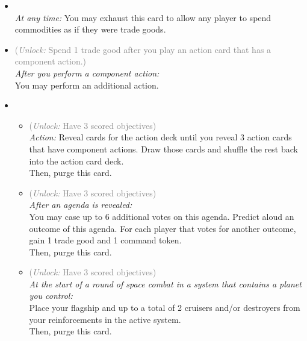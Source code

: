 \begin{multicols}{2}

\begin{itemize}
\item {}\\
\emph{At any time:} You may exhaust this card to allow any player to spend commodities as if they were trade goods.
\item {} \textcolor{gray}{(\emph{Unlock:} Spend 1 trade good after you play an action card that has a component action.)} \\
\emph{After you perform a component action:}\\ You may perform an additional action.
\item {}

\begin{itemize}
\item {}\textcolor{gray}{(\emph{Unlock:} Have 3 scored objectives)}\\
\emph{Action:} Reveal cards for the action deck until you reveal 3 action cards that have component actions. Draw those cards and shuffle the rest back into the action card deck.\\
Then, purge this card.

\item {}\textcolor{gray}{(\emph{Unlock:} Have 3 scored objectives)}\\
\emph{After an agenda is revealed:}\\
You may case up to 6 additional votes on this agenda. Predict aloud an outcome of this agenda. For each player that votes for another outcome, gain 1 trade good and 1 command token.\\
Then, purge this card.

\item {} \textcolor{gray}{(\emph{Unlock:} Have 3 scored objectives)}\\
\emph{At the start of a round of space combat in a system that contains a planet you control:}\\ Place your flagship and up to a total of 2 cruisers and/or destroyers from your reinforcements in the active system.\\Then, purge this card.
\end{itemize}
\end{itemize}


\end{multicols}
